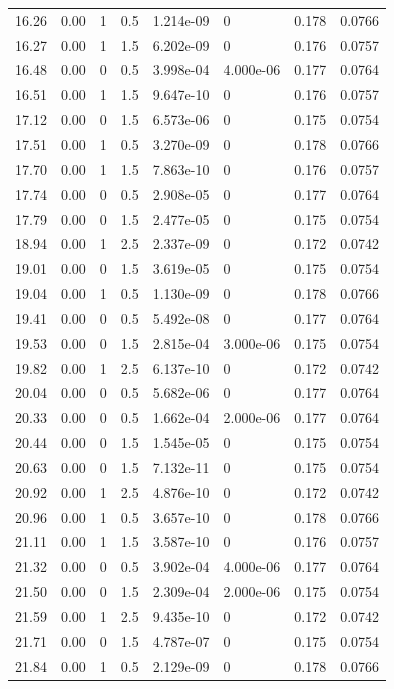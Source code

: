\documentclass[preview]{standalone}
\begin{document}
{{{\begin{tabular}{L{1.2cm}C{1.2cm} C{0.3cm}C{0.5cm} C{1.4cm}C{1.4cm} C{1.4cm}C{1.4cm}}
  16.26  &  0.00  & 1     & 0.5 &  1.214e-09  & 0  & 0.178 &  0.0766   \\ 
  16.27  &  0.00  & 1     & 1.5 &  6.202e-09  & 0  & 0.176 &  0.0757   \\ 
  16.48  &  0.00  & 0     & 0.5 &  3.998e-04  & 4.000e-06  & 0.177 &  0.0764   \\ 
  16.51  &  0.00  & 1     & 1.5 &  9.647e-10  & 0  & 0.176 &  0.0757   \\ 
  17.12  &  0.00  & 0     & 1.5 &  6.573e-06  & 0  & 0.175 &  0.0754   \\ 
  17.51  &  0.00  & 1     & 0.5 &  3.270e-09  & 0  & 0.178 &  0.0766   \\ 
  17.70  &  0.00  & 1     & 1.5 &  7.863e-10  & 0  & 0.176 &  0.0757   \\ 
  17.74  &  0.00  & 0     & 0.5 &  2.908e-05  & 0  & 0.177 &  0.0764   \\ 
  17.79  &  0.00  & 0     & 1.5 &  2.477e-05  & 0  & 0.175 &  0.0754   \\ 
  18.94  &  0.00  & 1     & 2.5 &  2.337e-09  & 0  & 0.172 &  0.0742   \\ 
  19.01  &  0.00  & 0     & 1.5 &  3.619e-05  & 0  & 0.175 &  0.0754   \\ 
  19.04  &  0.00  & 1     & 0.5 &  1.130e-09  & 0  & 0.178 &  0.0766   \\ 
  19.41  &  0.00  & 0     & 0.5 &  5.492e-08  & 0  & 0.177 &  0.0764   \\ 
  19.53  &  0.00  & 0     & 1.5 &  2.815e-04  & 3.000e-06  & 0.175 &  0.0754   \\ 
  19.82  &  0.00  & 1     & 2.5 &  6.137e-10  & 0  & 0.172 &  0.0742   \\ 
  20.04  &  0.00  & 0     & 0.5 &  5.682e-06  & 0  & 0.177 &  0.0764   \\ 
  20.33  &  0.00  & 0     & 0.5 &  1.662e-04  & 2.000e-06  & 0.177 &  0.0764   \\ 
  20.44  &  0.00  & 0     & 1.5 &  1.545e-05  & 0  & 0.175 &  0.0754   \\ 
  20.63  &  0.00  & 0     & 1.5 &  7.132e-11  & 0  & 0.175 &  0.0754   \\ 
  20.92  &  0.00  & 1     & 2.5 &  4.876e-10  & 0  & 0.172 &  0.0742   \\ 
  20.96  &  0.00  & 1     & 0.5 &  3.657e-10  & 0  & 0.178 &  0.0766   \\ 
  21.11  &  0.00  & 1     & 1.5 &  3.587e-10  & 0  & 0.176 &  0.0757   \\ 
  21.32  &  0.00  & 0     & 0.5 &  3.902e-04  & 4.000e-06  & 0.177 &  0.0764   \\ 
  21.50  &  0.00  & 0     & 1.5 &  2.309e-04  & 2.000e-06  & 0.175 &  0.0754   \\ 
  21.59  &  0.00  & 1     & 2.5 &  9.435e-10  & 0  & 0.172 &  0.0742   \\ 
  21.71  &  0.00  & 0     & 1.5 &  4.787e-07  & 0  & 0.175 &  0.0754   \\ 
  21.84  &  0.00  & 1     & 0.5 &  2.129e-09  & 0  & 0.178 &  0.0766   \\ 
\hline 
\end{tabular} 

}}}
\end{document}
